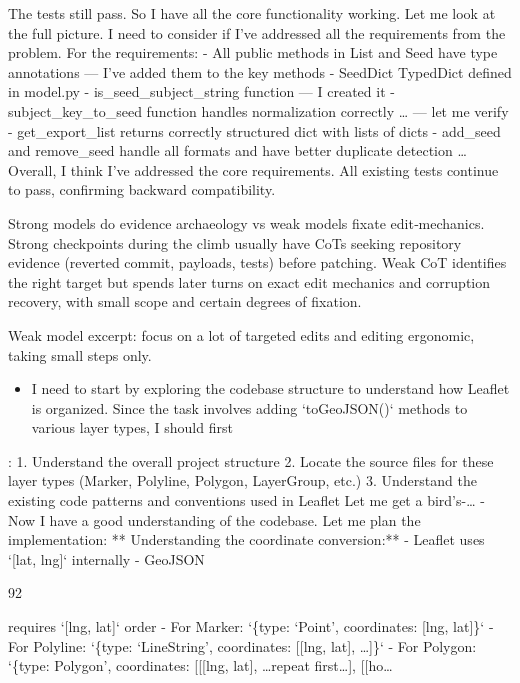 \documentclass[
  10
]{article}
\providecommand{\tightlist}{%
  \setlength{\itemsep}{0pt}\setlength{\parskip}{0pt}}
\begin{document}
The tests still pass. So I have all the core functionality working. Let
me look at the full picture. I need to consider if I've addressed all
the requirements from the problem. For the requirements: - All public
methods in List and Seed have type annotations --- I've added them to
the key methods - SeedDict TypedDict defined in model.py -
is\_seed\_subject\_string function --- I created it -
subject\_key\_to\_seed function handles normalization correctly \ldots{}
--- let me verify - get\_export\_list returns correctly structured dict
with lists of dicts - add\_seed and remove\_seed handle all formats and
have better duplicate detection \ldots{} Overall, I think I've addressed
the core requirements. All existing tests continue to pass, confirming
backward compatibility.

Strong models do evidence archaeology vs weak models fixate
edit‐mechanics. Strong checkpoints during the climb usually have CoTs
seeking repository evidence (reverted commit, payloads, tests) before
patching. Weak CoT identifies the right target but spends later turns on
exact edit mechanics and corruption recovery, with small scope and
certain degrees of fixation.

Weak model excerpt: focus on a lot of targeted edits and editing
ergonomic, taking small steps only.

\begin{itemize}
\tightlist
\item
  I need to start by exploring the codebase structure to understand how
  Leaflet is organized. Since the task involves adding `toGeoJSON()`
  methods to various layer types, I should first
\end{itemize}

: 1. Understand the overall project structure 2. Locate the source files
for these layer types (Marker, Polyline, Polygon, LayerGroup, etc.) 3.
Understand the existing code patterns and conventions used in Leaflet
Let me get a bird's-\ldots{} - Now I have a good understanding of the
codebase. Let me plan the implementation: ** Understanding the
coordinate conversion:** - Leaflet uses `{[}lat, lng{]}` internally -
GeoJSON

92

requires `{[}lng, lat{]}` order - For Marker: `\{type: `Point',
coordinates: {[}lng, lat{]}\}` - For Polyline: `\{type: `LineString',
coordinates: {[}{[}lng, lat{]}, \ldots{]}\}` - For Polygon: `\{type:
Polygon', coordinates: {[}{[}{[}lng, lat{]}, \ldots repeat
first\ldots{]}, {[}{[}ho\ldots{}
\end{document}
